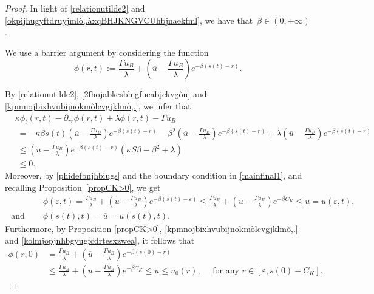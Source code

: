 \documentclass[12pt,a4paper,intlimits,sumlimits]{amsart}
\theoremstyle{definition}
\theoremstyle{plain}
\numberwithin{equation}{section}
\renewcommand{\le}{\leqslant}
\begin{document}
\begin{proof}
In light of \eqref{relationutilde2} and \eqref{okpijhugyftdruyjmlò,.àxqBHJKNGVCUhbjnaekfml}, we have that~$\beta\in(0,+\infty)$.

We use a barrier argument by considering the function
\begin{equation}\label{phidefbnjhbiugs}
\phi(r, t):= \frac{\Gamma u_B}{\lambda}+\left(\overline u -\frac{\Gamma u_B}{\lambda}\right)e^{-\beta(s(t)-r)}.
\end{equation}

By \eqref{relationutilde2}, \eqref{2fhojabkcsbhigfueabjckvgòu} and \eqref{kpmnojbixhvubijnokmòlcvgjklmò,.},  we infer that
\[
\begin{split}
&\kappa \phi_t (r,t)-\partial_{rr} \phi(r,t)+\lambda \phi(r,t)- \Gamma u_B \\&\;=-\kappa\beta \dot{s}(t)\left(\overline u -\frac{\Gamma u_B}{\lambda}\right) e^{-\beta(s(t)-r)}
-\beta^2\left(\overline u -\frac{\Gamma u_B}{\lambda}\right) e^{-\beta(s(t)-r)}+\lambda\left(\overline u -\frac{\Gamma u_B}{\lambda}\right) e^{-\beta(s(t)-r)}\\
&\;\le\left(\overline u -\frac{\Gamma u_B}{\lambda}\right) e^{-\beta(s(t)-r)}\left(\kappa S \beta-\beta^2 +\lambda \right)\\
&\;\le 0.
\end{split}
\]
Moreover, by \eqref{phidefbnjhbiugs} and the boundary condition in \eqref{mainfinal1}, and recalling Proposition~\ref{propCK>0}, we get
\[
\begin{split}
&\phi(\varepsilon, t) =\frac{\Gamma u_B}{\lambda}+\left(\overline u -\frac{\Gamma u_B}{\lambda}\right)e^{-\beta(s(t)-\varepsilon)}\le \frac{\Gamma u_B}{\lambda}+\left(\overline u -\frac{\Gamma u_B}{\lambda}\right)e^{-\beta C_K}\le\underline u = u(\varepsilon,  t),\\
\mbox{ and } \quad &\phi(s(t), t)=\overline u = u(s(t), t).
\end{split}
\]
Furthermore, by Proposition \ref{propCK>0}, \eqref{kpmnojbixhvubijnokmòlcvgjklmò,.} and \eqref{kolmjopjnhbgyugfcdrtesxzwea}, it follows that
\begin{equation}\label{qòwlwakpmofjnibhcduxjzkmox}
\begin{split}
\phi(r, 0)&=\frac{\Gamma u_B}{\lambda}+\left(\overline u -\frac{\Gamma u_B}{\lambda}\right)e^{-\beta(s(0)-r)}\\
&\le \frac{\Gamma u_B}{\lambda}+\left(\overline u -\frac{\Gamma u_B}{\lambda}\right)e^{-\beta C_K}\le \underline u\le u_0(r), \quad\mbox{ for any } r\in [\varepsilon, s(0)-C_K].
\end{split}
\end{equation}


\end{proof}
\end{document}
